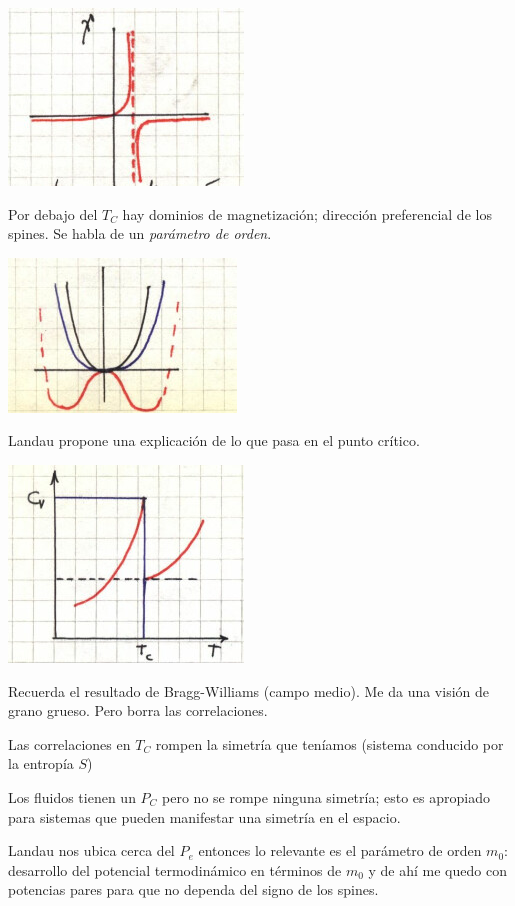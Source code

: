 \documentclass[10pt,oneside]{CBFT_book}
\begin{document}
\includegraphics[scale=0.4]{images/1606337044.jpg}

Por debajo del $T_C$ hay dominios de magnetización; dirección preferencial de los spines.
Se habla de un {\it parámetro de orden}.

\includegraphics[scale=0.4]{images/1606337048.jpg}

Landau propone una explicación de lo que pasa en el punto crítico.

\includegraphics[scale=0.4]{images/1606337054.jpg}

Recuerda el resultado de Bragg-Williams (campo medio). Me da una visión de grano grueso.
Pero borra las correlaciones.

Las correlaciones en $T_C$ rompen la simetría que teníamos (sistema conducido por la entropía $S$)

Los fluidos tienen un $P_C$ pero no se rompe ninguna simetría; esto es apropiado para sistemas que
pueden manifestar una simetría en el espacio.

Landau nos ubica cerca del $P_e$ entonces lo relevante es el parámetro de orden $m_0$: desarrollo del potencial
termodinámico en términos de $m_0$ y de ahí me quedo con potencias pares para que no dependa del signo de los
spines.
\end{document}
